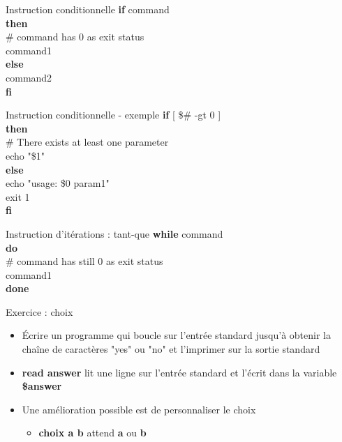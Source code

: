 \documentclass[xcolor=table]{beamer}
\begin{document}
\begin{frame}{Instruction conditionnelle}
\textbf{if} command\\
\textbf{then}\\
\quad \# command has 0 as exit status\\
\quad command1\\
\textbf{else}\\
\quad command2\\
\textbf{fi}\\
\end{frame}

\begin{frame}{Instruction conditionnelle - exemple}
\textbf{if} [ \$\# -gt 0 ]\\
\textbf{then}\\
\quad \# There exists at least one parameter\\
\quad echo "\$1"\\
\textbf{else}\\
\quad echo "usage: \$0 param1"\\
\quad exit 1\\
\textbf{fi}\\
\end{frame}

\begin{frame}{Instruction d'itérations : tant-que}
\textbf{while} command\\
\textbf{do}\\
\quad \# command has still 0 as exit status\\
\quad command1\\
\textbf{done}\\
\end{frame}

\begin{frame}{Exercice : choix}
\begin{itemize}
    \item Écrire un programme qui boucle sur l'entrée standard jusqu'à obtenir la chaîne de caractères "yes" ou "no" et l'imprimer sur la sortie standard
    \item \textbf{read answer} lit une ligne sur l'entrée standard et l'écrit dans la variable \textbf{\$answer}
    \item Une amélioration possible est de personnaliser le choix
    \begin{itemize}
        \item \textbf{choix a b} attend \textbf{a} ou \textbf{b}
    \end{itemize}
\end{itemize}
\end{frame}
\end{document}
